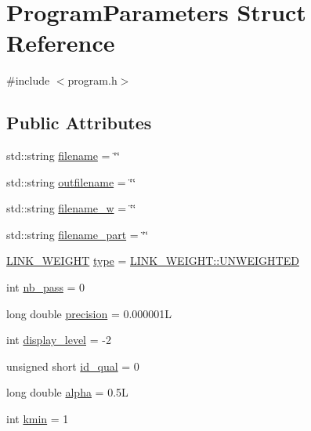 \hypertarget{structProgramParameters}{}\section{Program\+Parameters Struct Reference}
\label{structProgramParameters}


{\ttfamily \#include $<$program.\+h$>$}

\subsection*{Public Attributes}
\begin{DoxyCompactItemize}
\item 
std\+::string \hyperlink{structProgramParameters_af8cc2fe608d37b7dcaa36dafe9b8dbc4}{filename} = \char`\"{}\char`\"{}
\item 
std\+::string \hyperlink{structProgramParameters_a7c70e3cfa86f6b92aff2f31efbe13c89}{outfilename} = \char`\"{}\char`\"{}
\item 
std\+::string \hyperlink{structProgramParameters_a8061660e1295ee6c0b07006493707fd1}{filename\+\_\+w} = \char`\"{}\char`\"{}
\item 
std\+::string \hyperlink{structProgramParameters_a458baf806b371d7bfb573484f499a8e0}{filename\+\_\+part} = \char`\"{}\char`\"{}
\item 
\hyperlink{program_8h_ae6ceb3d65141eae67f722c4c39a3a2df}{L\+I\+N\+K\+\_\+\+W\+E\+I\+G\+HT} \hyperlink{structProgramParameters_a16744d2514e8a8f026f5833aac619ae3}{type} = \hyperlink{program_8h_ae6ceb3d65141eae67f722c4c39a3a2dfa52d154e24f499de7f8d658277a292f97}{L\+I\+N\+K\+\_\+\+W\+E\+I\+G\+H\+T\+::\+U\+N\+W\+E\+I\+G\+H\+T\+ED}
\item 
int \hyperlink{structProgramParameters_a75d7c2a2619daa6e44ba03ae2e6e4c19}{nb\+\_\+pass} = 0
\item 
long double \hyperlink{structProgramParameters_a11962f1fb0a7954aa5459b6d3a038b32}{precision} = 0.\+000001L
\item 
int \hyperlink{structProgramParameters_a15ad41dc8bb6e6c43ac4a124b6f03652}{display\+\_\+level} = -\/2
\item 
unsigned short \hyperlink{structProgramParameters_ad69c6ad8968a6167a834f775d3dbec50}{id\+\_\+qual} = 0
\item 
long double \hyperlink{structProgramParameters_aa1e71492353d64a9617447f5a5465dd2}{alpha} = 0.\+5L
\item 
int \hyperlink{structProgramParameters_ad53b0ade3cb5b88dd73181cd94385fe2}{kmin} = 1

\end{DoxyCompactItemize}
